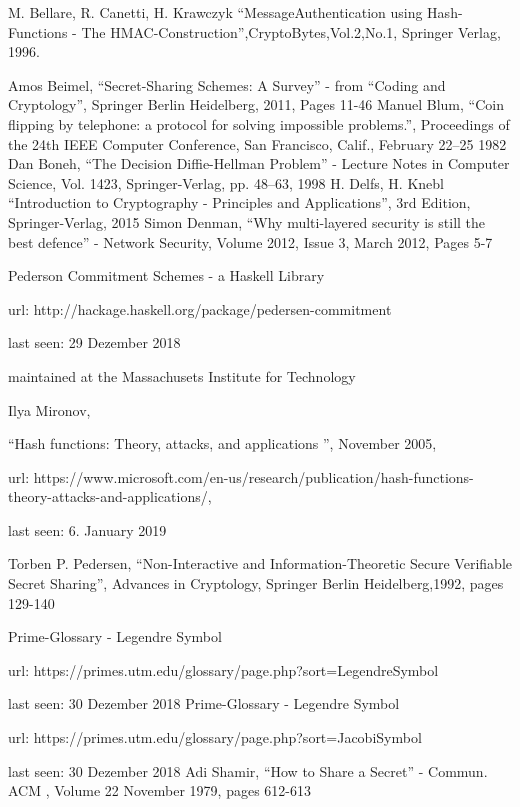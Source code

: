 \begin{thebibliography}{00}
	 M. Bellare, R. Canetti, H. Krawczyk ``MessageAuthentication using Hash-Functions - The HMAC-Construction'',CryptoBytes,Vol.2,No.1, Springer Verlag, 1996.
	
	 Amos Beimel, ``Secret-Sharing Schemes: A Survey'' - from ``Coding and Cryptology'', Springer Berlin Heidelberg, 2011, Pages 11-46
	Manuel Blum, ``Coin flipping by telephone: a protocol for solving impossible
	problems.'', Proceedings of the 24th IEEE Computer Conference, San Francisco,
	Calif., February 22–25 1982	
	 Dan Boneh, ``The Decision Diffie-Hellman Problem'' - Lecture Notes in Computer Science, Vol. 1423, Springer-Verlag, pp. 48--63, 1998 
	 H. Delfs, H. Knebl ``Introduction to Cryptography - Principles and Applications'', 3rd Edition, Springer-Verlag, 2015
	 Simon Denman, ``Why multi-layered security is still the best defence'' - Network Security, Volume 2012, Issue 3, March 2012, Pages 5-7
	
	 Pederson Commitment Schemes - a Haskell Library 
	
	url: http://hackage.haskell.org/package/pedersen-commitment 
	
	last seen: 29 Dezember 2018 
	
	maintained at the Massachusets Institute for Technology
	
	 Ilya Mironov, 
	
	``Hash functions: Theory, attacks, and applications '',  November 2005,
	
	url: https://www.microsoft.com/en-us/research/publication/hash-functions-theory-attacks-and-applications/,
	
	last seen: 6. January 2019
	
	 Torben P. Pedersen, ``Non-Interactive and Information-Theoretic Secure Verifiable Secret Sharing'',
	Advances in Cryptology, Springer Berlin Heidelberg,1992,
	pages 129-140

	 Prime-Glossary - Legendre Symbol

	url: https://primes.utm.edu/glossary/page.php?sort=LegendreSymbol
	
	last seen: 30 Dezember 2018
	 Prime-Glossary - Legendre Symbol
	
	url: https://primes.utm.edu/glossary/page.php?sort=JacobiSymbol
	
	last seen: 30 Dezember 2018
	 Adi Shamir, ``How to Share a Secret'' - Commun. ACM , Volume 22 November 1979, pages 612-613
		
	
\end{thebibliography}
\vspace{12pt}